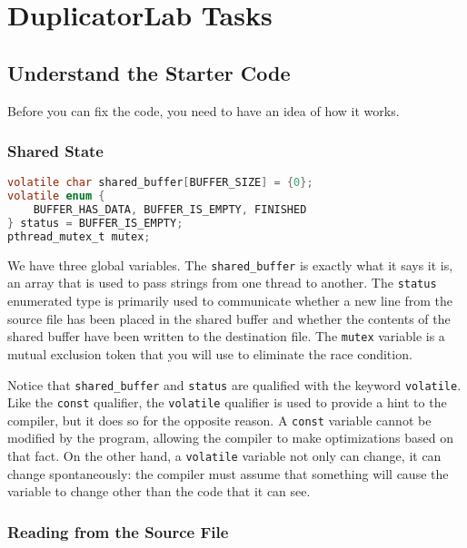     \section{DuplicatorLab Tasks}

    \subsection{Understand the Starter Code}

    Before you can fix the code, you need to have an idea of how it works.

    \subsubsection{Shared State}

%    
\begin{lstlisting}[language=c, numbers=none]
volatile char shared_buffer[BUFFER_SIZE] = {0};
volatile enum {
    BUFFER_HAS_DATA, BUFFER_IS_EMPTY, FINISHED
} status = BUFFER_IS_EMPTY;
pthread_mutex_t mutex;
\end{lstlisting}

    We have three global variables.
    The \lstinline{shared_buffer} is exactly what it says it is, an array that is used to pass strings from one thread to another.
    The \lstinline{status} enumerated type is primarily used to communicate whether a new line from the source file has been placed in the shared buffer and whether the contents of the shared buffer have been written to the destination file.
    The \lstinline{mutex} variable is a mutual exclusion token that you will use to eliminate the race condition.

    Notice that \lstinline{shared_buffer} and \lstinline{status} are qualified with the keyword \lstinline{volatile}.
    Like the \lstinline{const} qualifier, the \lstinline{volatile} qualifier is used to provide a hint to the compiler, but it does so for the opposite reason.
    A \lstinline{const} variable cannot be modified by the program, allowing the compiler to make optimizations based on that fact.
    On the other hand, a \lstinline{volatile} variable not only can change, it can change spontaneously: the compiler must assume that something will cause the variable to change other than the code that it can see.

    \subsubsection{Reading from the Source File}\label{subsubsec:understandReader}


